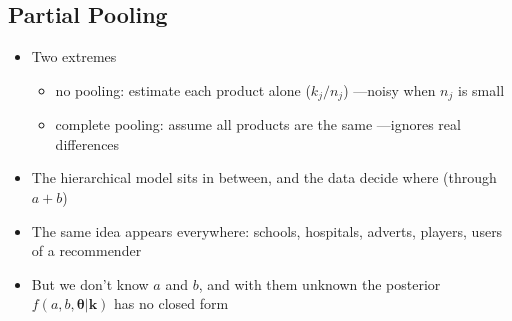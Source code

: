 \begin{slide}
\section{Partial Pooling}

\begin{PauseHighLight}
  \begin{itemize}
  \item Two extremes
    \begin{itemize}
    \item no pooling: estimate each product alone ($k_j/n_j$)\pause{}
      ---noisy when $n_j$ is small\pauseb
    \item complete pooling: assume all products are the same\pause{}
      ---ignores real differences\pauseb
    \end{itemize}
  \item The hierarchical model sits in between, and the data decide
    where (through $a+b$)\pause
  \item The same idea appears everywhere: schools, hospitals, adverts,
    players, users of a recommender\pause
  \item But we don't know $a$ and $b$, and with them unknown the
    posterior $f(a,b,\bm{\theta}|\bm{k})$ has no closed form\pause
  \end{itemize}
\end{PauseHighLight}

\end{slide}

\Outline %

